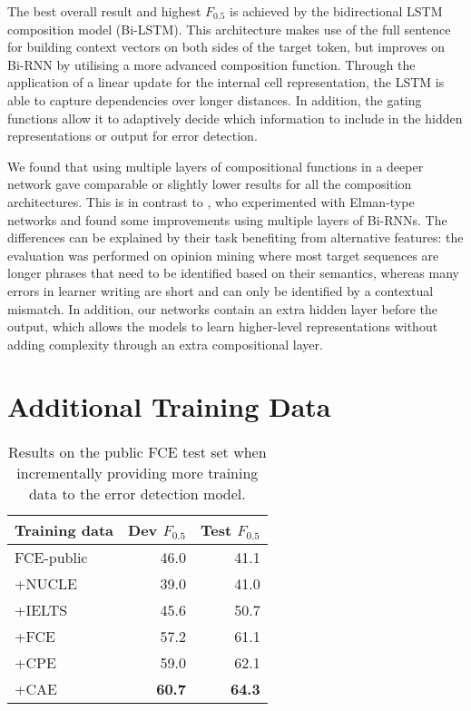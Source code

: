 \documentclass[11pt]{article}
\begin{document}
The best overall result and highest $F_{0.5}$ is achieved by the bidirectional LSTM composition model (Bi-LSTM). 
This architecture makes use of the full sentence for building context vectors on both sides of the target token, but improves on Bi-RNN by utilising a more advanced composition function. Through the application of a linear update for the internal cell representation, the LSTM is able to capture dependencies over longer distances. In addition, the gating functions allow it to adaptively decide which information to include in the hidden representations or output for error detection.

We found that using multiple layers of compositional functions in a deeper network gave comparable or slightly lower results for all the composition architectures. 
This is in contrast to , who experimented with Elman-type networks and found some improvements using multiple layers of Bi-RNNs.
The differences can be explained by their task benefiting from alternative features: the evaluation was performed on opinion mining where most target sequences are longer phrases that need to be identified based on their semantics, whereas many errors in learner writing are short and can only be identified by a contextual mismatch. In addition,
our networks contain an extra hidden layer before the output, which allows the models to learn higher-level representations without adding complexity through an extra compositional layer.



\section{Additional Training Data}
\label{sec:bigdata}

\begin{table}[t]
\setlength\tabcolsep{14.5pt}
\begin{tabular}{lrr} \toprule
Training data & Dev $F_{0.5}$ & Test $F_{0.5}$ \\ \midrule
FCE-public & 46.0 & 41.1 \\
+NUCLE & 39.0 & 41.0 \\
+IELTS & 45.6 & 50.7 \\
+FCE & 57.2 & 61.1 \\
+CPE & 59.0 & 62.1 \\
+CAE & \textbf{60.7} & \textbf{64.3} \\ \bottomrule
\end{tabular}
\caption{Results on the public FCE test set when incrementally providing more training data to the error detection model.}
\label{tab:bigdata}
\end{table}
\end{document}
